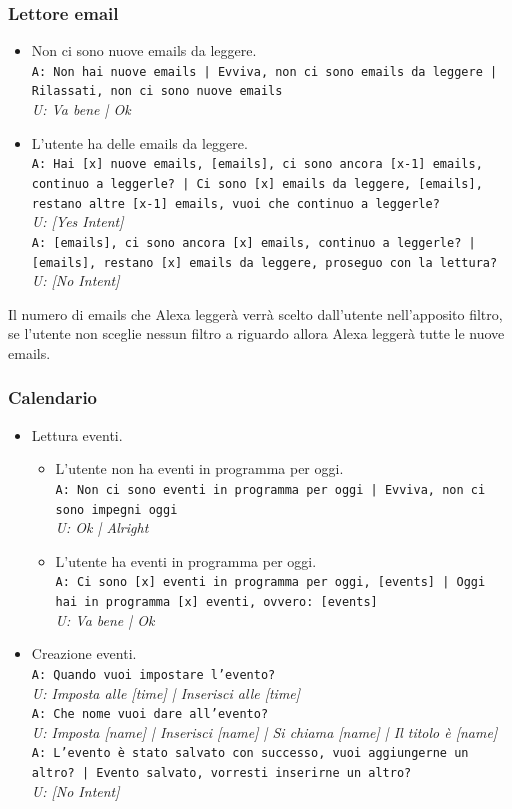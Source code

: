 \subsubsection{Lettore email}
\begin{itemize}
	\item Non ci sono nuove emails da leggere. \\
	\texttt{A: Non hai nuove emails | Evviva, non ci sono emails da leggere | Rilassati, non ci sono nuove emails}\\
	\textit{U: Va bene | Ok}
	\item L'utente ha delle emails da leggere. \\
	\texttt{A: Hai [x] nuove emails, [emails], ci sono ancora [x-1] emails, continuo a leggerle? | Ci sono [x] emails da leggere, [emails], restano altre [x-1] emails, vuoi che continuo a leggerle?}\\
	\textit{U: [Yes Intent]}\\
	\texttt{A: [emails], ci sono ancora [x] emails, continuo a leggerle? | [emails], restano [x] emails da leggere, proseguo con la lettura?}\\
	\textit{U: [No Intent]}\\
\end{itemize}
Il numero di emails che Alexa leggerà verrà scelto dall'utente nell'apposito filtro, se l'utente non sceglie nessun filtro a riguardo allora Alexa leggerà tutte le nuove emails.

\subsubsection{Calendario}
\begin{itemize}
	\item Lettura eventi.
	\begin{itemize}
		\item L'utente non ha eventi in programma per oggi.\\
		\texttt{A: Non ci sono eventi in programma per oggi | Evviva, non ci sono impegni oggi}\\
		\textit{U: Ok | Alright}
		\item L'utente ha eventi in programma per oggi.\\
		\texttt{A: Ci sono [x] eventi in programma per oggi, [events] | Oggi hai in programma [x] eventi, ovvero: [events]}\\
		\textit{U: Va bene | Ok}
	\end{itemize}
	\item Creazione eventi.\\
	\texttt{A: Quando vuoi impostare l'evento?}\\
	\textit{U: Imposta alle [time] | Inserisci alle [time]}\\
	\texttt{A: Che nome vuoi dare all'evento?}\\
	\textit{U: Imposta [name] | Inserisci [name] | Si chiama [name] | Il titolo è [name]}\\
	\texttt{A: L'evento è stato salvato con successo, vuoi aggiungerne un altro? | Evento salvato, vorresti inserirne un altro?}\\
	\textit{U: [No Intent]}
\end{itemize}
